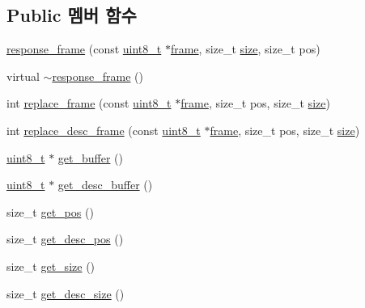 \subsection*{Public 멤버 함수}
\begin{DoxyCompactItemize}
\item 
\hyperlink{classavdecc__lib_1_1response__frame_a9798341585fb9dbbd7bfb955061b53e0}{response\+\_\+frame} (const \hyperlink{stdint_8h_aba7bc1797add20fe3efdf37ced1182c5}{uint8\+\_\+t} $\ast$\hyperlink{gst__avb__playbin_8c_ac8e710e0b5e994c0545d75d69868c6f0}{frame}, size\+\_\+t \hyperlink{gst__avb__playbin_8c_a439227feff9d7f55384e8780cfc2eb82}{size}, size\+\_\+t pos)
\item 
virtual \hyperlink{classavdecc__lib_1_1response__frame_ae3b3c84bbf7318b76b8cbdcae24adf49}{$\sim$response\+\_\+frame} ()
\item 
int \hyperlink{classavdecc__lib_1_1response__frame_adaac07821dba7c4ae2c35642d67a9a37}{replace\+\_\+frame} (const \hyperlink{stdint_8h_aba7bc1797add20fe3efdf37ced1182c5}{uint8\+\_\+t} $\ast$\hyperlink{gst__avb__playbin_8c_ac8e710e0b5e994c0545d75d69868c6f0}{frame}, size\+\_\+t pos, size\+\_\+t \hyperlink{gst__avb__playbin_8c_a439227feff9d7f55384e8780cfc2eb82}{size})
\item 
int \hyperlink{classavdecc__lib_1_1response__frame_a438c7ec184b6d10ffcd8bc97a4cfa773}{replace\+\_\+desc\+\_\+frame} (const \hyperlink{stdint_8h_aba7bc1797add20fe3efdf37ced1182c5}{uint8\+\_\+t} $\ast$\hyperlink{gst__avb__playbin_8c_ac8e710e0b5e994c0545d75d69868c6f0}{frame}, size\+\_\+t pos, size\+\_\+t \hyperlink{gst__avb__playbin_8c_a439227feff9d7f55384e8780cfc2eb82}{size})
\item 
\hyperlink{stdint_8h_aba7bc1797add20fe3efdf37ced1182c5}{uint8\+\_\+t} $\ast$ \hyperlink{classavdecc__lib_1_1response__frame_ad4680d622c198b5256c03b2eb2638c22}{get\+\_\+buffer} ()
\item 
\hyperlink{stdint_8h_aba7bc1797add20fe3efdf37ced1182c5}{uint8\+\_\+t} $\ast$ \hyperlink{classavdecc__lib_1_1response__frame_a87db6e7ad7e047437cf9c9eaab873626}{get\+\_\+desc\+\_\+buffer} ()
\item 
size\+\_\+t \hyperlink{classavdecc__lib_1_1response__frame_a4038092b7b420000faefc768241adb42}{get\+\_\+pos} ()
\item 
size\+\_\+t \hyperlink{classavdecc__lib_1_1response__frame_a6e6f6cc3d681d41c6de6139ca9cb79d9}{get\+\_\+desc\+\_\+pos} ()
\item 
size\+\_\+t \hyperlink{classavdecc__lib_1_1response__frame_adf55ed6a1edf8e1aa4f3f5f97936ad1e}{get\+\_\+size} ()
\item 
size\+\_\+t \hyperlink{classavdecc__lib_1_1response__frame_a5302ae13c549f066040ce0e7c7d11ae6}{get\+\_\+desc\+\_\+size} ()
\end{DoxyCompactItemize}

